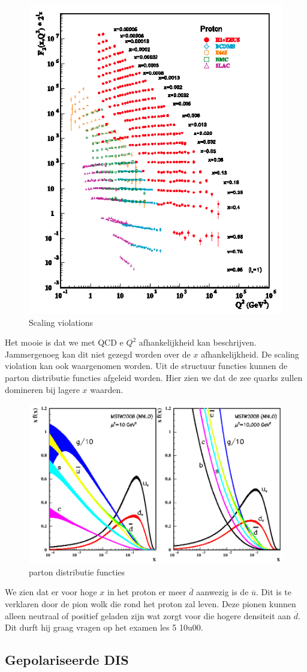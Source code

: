 \documentclass[../main.tex]{subfiles}
\begin{document}
\begin{figure}[h]
    \centering
    \includegraphics[width=0.4\linewidth]{DIS_nucleon_structuur_pdf/scale_viol.png}
    \caption{Scaling violations}%
    \label{fig:scale_viol}
\end{figure}

Het mooie is dat we met QCD e $Q^2$ afhankelijkheid kan beschrijven. Jammergenoeg kan dit niet gezegd worden over de $x$ afhankelijkheid. De scaling violation kan ook waargenomen worden. Uit  de structuur functies kunnen de parton distributie functies afgeleid worden. Hier zien we dat de zee quarks zullen domineren bij lagere $x$ waarden.

\begin{figure}[h]
    \centering
    \includegraphics[width=0.6\linewidth]{DIS_nucleon_structuur_pdf/part_dist_func.png}
    \caption{parton distributie functies}%
    \label{fig:part_dist_func}
\end{figure}

We zien dat er voor hoge $x$ in het proton er meer $\overline d$ aanwezig is de $\overline u$. Dit is te verklaren door de pion wolk die rond het proton zal leven. Deze pionen kunnen alleen neutraal of positief geladen zijn wat zorgt voor die hogere densiteit aan $\overline d$. {\color{red} Dit durft hij graag vragen op het examen les 5 10u00}.

\subsection{Gepolariseerde DIS}%
\label{sub:gepolariseerde_dis}
\end{document}
